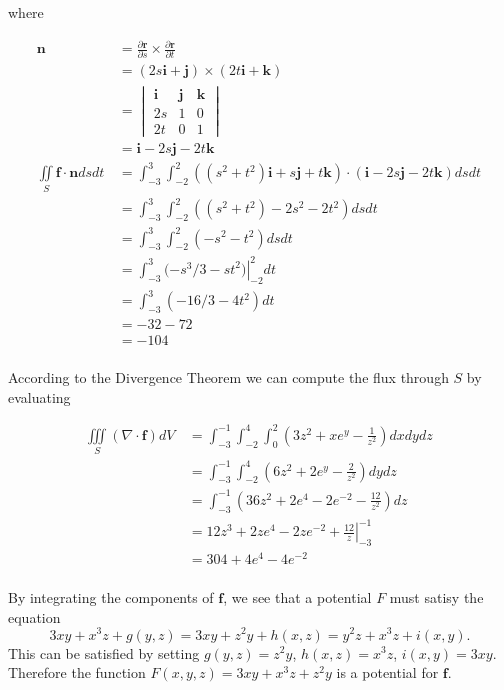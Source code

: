where

\begin{align*}
 \mathbf{n}
 &= \frac{\partial \mathbf{r}}{\partial s} \times \frac{\partial \mathbf{r}}{\partial t} \\
 &= (2s\mathbf{i} + \mathbf{j}) \times (2t\mathbf{i} + \mathbf{k}) \\
 &= \begin{vmatrix}
     \mathbf{i} & \mathbf{j} & \mathbf{k} \\
     2s & 1 & 0 \\
     2t & 0 & 1
    \end{vmatrix} \\
 &= \mathbf{i} -2s\mathbf{j} -2t\mathbf{k} \\
 \iint\limits_S \! \mathbf{f} \cdot \mathbf{n} ds dt \,
 &= \int_{-3}^{3} \int_{-2}^{2} \! ((s^2+t^2)\mathbf{i} + s\mathbf{j} + t\mathbf{k}) \cdot (\mathbf{i} -2s\mathbf{j} -2t\mathbf{k}) ds dt \, \\
 &= \int_{-3}^{3} \int_{-2}^{2} \! ((s^2+t^2) - 2s^2 - 2t^2) ds dt \, \\
 &= \int_{-3}^{3} \int_{-2}^{2} \! (-s^2 - t^2) ds dt \, \\
 &= \int_{-3}^{3} \! (\left. -s^3/3 - st^2) \right|_{-2}^{2} dt \, \\
 &= \int_{-3}^{3} \! (-16/3 - 4t^2) dt \, \\
 &= -32 - 72 \\
 &= -104 \, \\
\end{align*}

\item

According to the Divergence Theorem we can compute the flux through $S$ by
evaluating

\begin{align*}
 \iiint\limits_S \! (\nabla \cdot \mathbf{f}) dV \,
 &= \int_{-3}^{-1} \int_{-2}^{4} \int_{0}^{2} \! (3z^2 + xe^{y} - \frac{1}{z^2}) dxdydz \, \\
 &= \int_{-3}^{-1} \int_{-2}^{4} \! (6z^2 + 2e^y - \frac{2}{z^2}) dydz \, \\
 &= \int_{-3}^{-1} \! (36z^2 + 2e^4 - 2e^{-2} - \frac{12}{z^2}) dz \, \\
 &= \left. 12z^3 + 2ze^4 - 2ze^{-2} + \frac{12}{z} \right|_{-3}^{-1} \\
 &= 304 + 4e^4 - 4e^{-2} \\
\end{align*}


\item
\BEN
\item
By integrating the components of $\mathbf{f}$, we see that a potential $F$ must
satisy the equation \[3xy + x^3z + g(y,z) = 3xy + z^2y + h(x,z) = y^2z + x^3z +
i(x,y).\]  This can be satisfied by setting $g(y,z) = z^2y$, $h(x,z) = x^3z$,
$i(x,y) = 3xy$.  Therefore the function $F(x,y,z) = 3xy + x^3z + z^2y$ is a
potential for $\mathbf{f}$.

